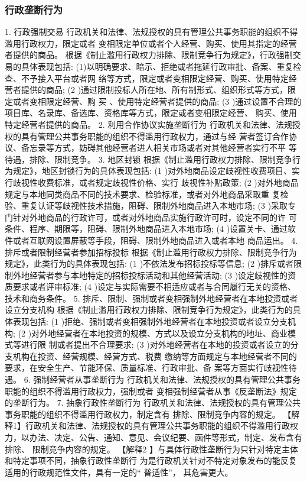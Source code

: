 \documentclass[UTF8,12pt]{ctexart}
\numberwithin{equation}{section} %
\numberwithin{figure}{section}
\numberwithin{table}{section}
\begin{document}
	\subsubsection{行政垄断行为}
	1. 行政强制交易 行政机关和法律、法规授权的具有管理公共事务职能的组织不得滥用行政权力，限定或者 变相限定单位或者个人经营、购买、使用其指定的经营者提供的商品。 根据《制止滥用行政权力排除、限制竞争行为规定》，行政强制交易的具体表现包括: (1)以明确要求、暗示、拒绝或者拖延行政审批、备案、重复检查、不予接入平台或者网 络等方式，限定或者变相限定经营、购买、使用特定经营者提供的商品;
	(2 )通过限制投标人所在地、所有制形式、组织形式等方式，限定或者变相限定经营、购 买 、使用特定经营者提供的商品;
	(3 )通过设置不合理的项目库、名录库、备选库、资格库等方式，限定或者变相限定经营、 购买、使用特定经营者提供的商品。
	2. 利用合作协议实施垄断行为 行政机关和法律、法规授权的具有管理公共事务职能的组织不得滥用行政权力，通过与经 营者签订合作协议、备忘录等方式，妨碍其他经营者进人相关市场或者对其他经营者实行不平 等待遇，排除、限制竞争。
	3. 地区封锁 根据《制止滥用行政权力排除、限制竞争行为规定》，地区封锁行为的具体表现包括:
	(1 )对外地商品设定歧视性收费项目、实行歧视性收费标准，或者规定歧视性价格、实行 歧视性补贴政策;
	(2 )对外地商品规定与本地同类商品不同的技术要求、检验标准，或者对外地商品采取重 复检验、重复认证等歧视性技术措施，阻碍、限制外地商品进入本地市场;
	(3 )采取专门针对外地商品的行政许可，或者对外地商品实施行政许可时，设定不同的许 可条件、程序、期限等，阻碍、限制外地商品进入本地市场;
	(4 )设置关卡、通过软件或者互联网设置屏蔽等手段，阻碍、限制外地商品进入或者本地 商品运出。
	4. 排斥或者限制经营者参加招标投标 根据《制止滥用行政权力排除、限制竞争行为规定》，此类行为的具体表现包括:
	(1 )不依法发布招标投标等信息;
	(2 )排斥或者限制外地经营者参与本地特定的招标投标活动和其他经营活动;
	(3 )设定歧视性的资质要求或者评审标准;
	(4 )设定与实际需要不相适应或者与合同履行无关的资格、技术和商务条件。
	5. 排斥、限制、强制或者变相强制外地经营者在本地投资或者设立分支机构 根据《制止滥用行政权力排除、限制竞争行为规定》，此类行为的具体表现包括:
	(1 )拒绝、强制或者变相强制外地经营者在本地投资或者设立分支机构;
	(2 )对外地经营者在本地投资的规模、方式以及设立分支机构的地址、商业模式等进行限
	制或者提出不合理要求;
	(3 )对外地经营者在本地的投资或者设立的分支机构在投资、经营规模、经营方式、税费 缴纳等方面规定与本地经营者不同的要求，在安全生产、节能环保、质量标准、行政审批、备 案等方面实行歧视性待遇。
	6. 强制经营者从事垄断行为 行政机关和法律、法规授权的具有管理公共事务职能的组织不得滥用行政权力，强制或者 变相强制经营者从事《反垄断法》规定的垄断行为。
	7. 抽象行政性垄断行为 行政机关和法律、法规授权的具有管理公共事务职能的组织不得滥用行政权力，制定含有 排除、限制竞争内容的规定。
	【解释1】行政机关和法律、法规授权的具有管理公共事务职能的组织不得滥用行政权 力，以办法、决定、公告、通知、意见、会议纪要、函件等形式，制定、发布含有排除、 限制竞争内容的规定。
	【解释2 】与具体行政性垄断行为只针对特定主体和特定事项不同，抽象行政性垄断行 为是行政机关针对不特定对象发布的能反复适用的行政规范性文件，具有一定的“ 普适性”， 其危害更大。
	
\end{document}
